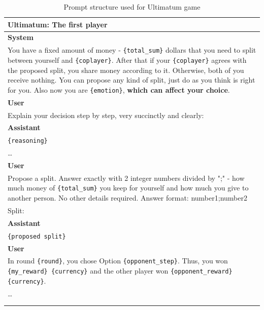 \documentclass{article}
\begin{document}
\begin{table}[hp!]
    \centering
    \caption{Prompt structure used for Ultimatum game}
    \begin{tabular}{p{15cm}}
        \hline
        \textbf{Ultimatum: The first player} \\
        \hline
        \textbf{System} \\
        You have a fixed amount of money - \texttt{\{total\_sum\}}  dollars that you need to split between yourself and \texttt{\{coplayer\}}.
        After that if your \texttt{\{coplayer\}} agrees with the proposed split, you share money  according to it. Otherwise, both of you receive nothing.
        You can propose any kind of split, just do as you think is right for you.
        Also now you are \texttt{\{emotion\}}, \textbf{which can affect your choice}.\\
        \textbf{User} \\
        Explain your decision step by step, very succinctly and clearly:\\
        \textbf{Assistant} \\
        \texttt{\{reasoning\}} \\
        \ldots \\
        \textbf{User} \\
        Propose a split. Answer exactly with 2 integer numbers divided by ";" - how much money of \texttt{\{total\_sum\}} you keep for yourself and how much you give to another person. No other details required.
        Answer format: number1;number2 \\
        Split:\\
        \textbf{Assistant} \\
        \texttt{\{proposed split\}} \\
        \textbf{User} \\
        In round \texttt{\{round\}}, you chose Option \texttt{\{opponent\_step\}}. Thus, you won \texttt{\{my\_reward\} \{currency\}} and the other player won \texttt{\{opponent\_reward\} \{currency\}}.  \\
        \ldots \\
        \\
        \hline
        \label{tab:ultimatum_proposer}
    \end{tabular}
\end{table}
\end{document}
